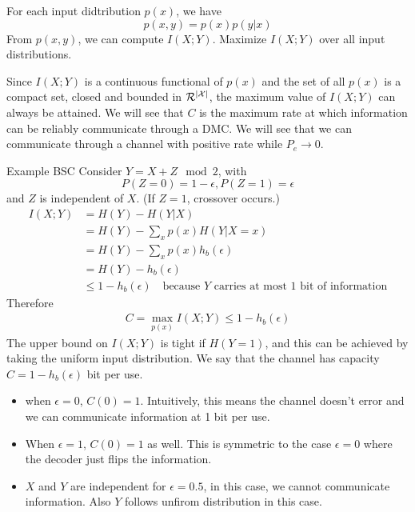 \documentclass[../main.tex]{subfiles}
\begin{document}
For each input didtribution $p(x)$, we have \[
p(x,y)=p(x)p(y|x)
\]
From $p(x,y)$, we can compute $I(X;Y)$. Maximize $I(X;Y)$ over all input distributions.
\begin{remark}
    Since $I(X;Y)$ is a continuous functional of $p(x)$ and the set of all $p(x)$ is a compact set, closed and bounded in $\mathcal{R}^{|\mathcal{X}|}$, the maximum value of $I(X;Y)$ can always be attained.
    \newline
    We will see that $C$ is the maximum rate at which information can be reliably communicate through a DMC.
    \newline
    We will see that we can communicate through a channel with positive rate while $P_e\to 0$.
\end{remark}
\begin{pbox}{Example BSC}
    Consider $Y=X+Z\mod 2$, with \[
    P(Z=0)=1-\epsilon, P(Z=1)=\epsilon
    \] and $Z$ is independent of $X$. (If $Z=1$, crossover occurs.)\\
    \begin{align*}
        I(X;Y)&=H(Y)-H(Y|X)\\
        &= H(Y)-\sum_xp(x)H(Y|X=x)\\
        &=H(Y)-\sum_xp(x)h_b(\epsilon)\\
        &=H(Y)-h_b(\epsilon)\\
        &\leq 1-h_b(\epsilon) \quad \text{because $Y$ carries at most 1 bit of information}
    \end{align*}
    Therefore \begin{align*}
        C=\max_{p(x)}I(X;Y)
        \leq 1-h_b(\epsilon)
    \end{align*}
    The upper bound on $I(X;Y)$ is tight if $H(Y=1)$, and this can be achieved by taking the uniform input distribution.
    \newline 
    We say that the channel has capacity $C=1-h_b(\epsilon)$ bit per use.
    \begin{remark}
    \begin{itemize}
        \item when $\epsilon=0$, $C(0)=1$. Intuitively, this means the channel doesn't error and we can communicate information at 1 bit per use.
        \item When $\epsilon=1$, $C(0)=1$ as well. This is symmetric to the case $\epsilon=0$ where the decoder just flips the information.
        \item $X$ and $Y$ are independent for $\epsilon=0.5$, in this case, we cannot communicate information. Also $Y$ follows unfirom distribution in this case.
    \end{itemize}
\end{remark}
\end{pbox}
\end{document}
